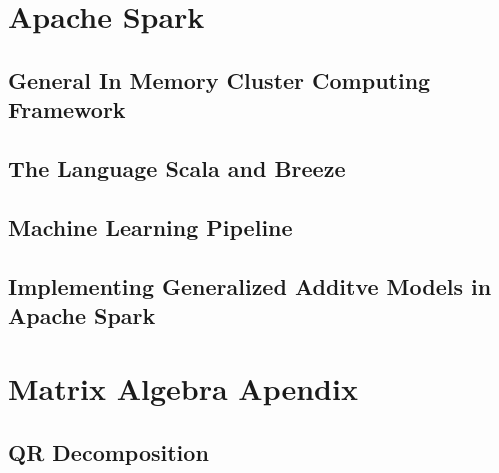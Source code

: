 \documentclass{article}
\begin{document}
    \section{Apache Spark}
        \subsection{General In Memory Cluster Computing Framework}
        \subsection{The Language Scala and Breeze}
        \subsection{Machine Learning Pipeline}
        \subsection{Implementing Generalized Additve Models in Apache Spark}
    
    \section{Matrix Algebra Apendix}
        \subsection{QR Decomposition}
        
    


    \newpage


    \newpage
\end{document}
